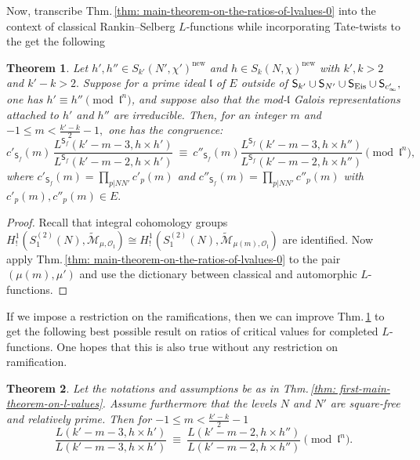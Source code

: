 \documentclass[11pt]{amsart}
\newtheorem{theorem}{Theorem}[section]
\begin{document}
Now, transcribe Thm.\,\ref{thm: main-theorem-on-the-ratios-of-lvalues-0} into the context of classical Rankin--Selberg $L$-functions while incorporating 
Tate-twists to the get the following


\begin{theorem}
\label{thm:reg-sem-poly}
	Let $h',h'' \in S_{k'}(N',\chi')^{\text{new}}$ and $h \in S_k(N,\chi)^{\text{new}}$ with $k',k > 2$ and $k'-k > 2.$  
	Suppose for a prime ideal $\mathfrak{l}$ of $E$ outside of 
$\mathsf{S}_{k'} \cup \mathsf{S}_{N'} \cup \mathsf{S}_{\textup{Eis}} \cup \mathsf{S}_{c'_\infty},$ one has  
$h' \equiv h'' \pmod{\mathfrak{l}^n}$, and suppose also that 
	the mod-$\mathfrak{l}$ Galois representations attached to $h' $ and $h''$ are irreducible. Then,
	 for an integer $m$ and $-1\leq m < \frac{k'-k}{2} - 1,$ one has the congruence:
	\begin{equation}
	\label{eqn:reg-sem-poly}
		c'_{\mathsf{S}_f}(m)\, \frac{L^{\mathsf{S}_f}(k'-m-3, h\times h' )}{L^{\mathsf{S}_f}(k'-m-2, h\times h' )} \ \equiv \ 
		c''_{\mathsf{S}_f}(m)\frac{L^{\mathsf{S}_f}(k'-m-3, h\times h'' )}{L^{\mathsf{S}_f}(k'-m-2, h\times h'')}  \pmod{\mathfrak{l}^n}, 
	\end{equation} 
	where $c'_{\mathsf{S}_f}(m) = \prod_{p |NN'} c'_p(m)$ and $c''_{\mathsf{S}_f}(m) = \prod_{p |NN'} c''_p(m)$ with $c'_p(m),c''_p(m) \in E.$	\label{thm: first-main-theorem-on-l-values}
\end{theorem}


\begin{proof}
Recall that integral cohomology groups
${H}^1_!(S^{(2)}_1(N), \mathcal{\widetilde{\mathcal{M}}}_{\mu,\mathcal{O}_\mathfrak{l}}) \cong 
{H}^1_!(S^{(2)}_1(N), \mathcal{\widetilde{\mathcal{M}}}_{\mu(m),\mathcal{O}_\mathfrak{l}})$ are identified. 
Now apply Thm.\,\ref{thm: main-theorem-on-the-ratios-of-lvalues-0} to the pair $(\mu(m), \mu')$ and 
use the dictionary between classical and automorphic $L$-functions.
\end{proof}

If we impose a restriction on the ramifications, then we can improve 
Thm.\,\ref{thm:reg-sem-poly} to get the following best possible result on ratios of critical values for completed $L$-functions. 
One hopes that this is also true without any restriction on ramification. 

\medskip
\begin{theorem} 
\label{thm: second-main-theorem-on-l-values}
Let the notations and assumptions be as in Thm.\,\ref{thm: first-main-theorem-on-l-values}. 
Assume furthermore that the levels $N$ and $N'$ are square-free and relatively prime. Then for $-1\leq m < \frac{k'-k}{2} - 1$ 
	\begin{equation}
	\label{eqn:best-possible-cong}
		\frac{L(k'-m-3, h\times h' )}{L(k'-m-3, h\times h' )} \ \equiv \  
		\frac{L(k'-m-2, h\times h'' )}{L(k'-m-2, h\times h'')} \pmod{\mathfrak{l}^n}.
	\end{equation} 	
\end{theorem}
\end{document}
